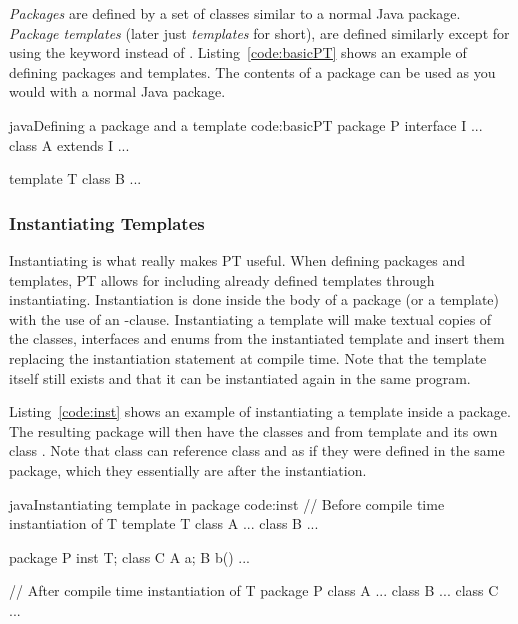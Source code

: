 \emph{Packages} are defined by a set of classes similar to a normal Java package.
\emph{Package templates} (later just \emph{templates} for short), are defined similarly except for using the keyword  instead of .
Listing~\vref{code:basicPT} shows an example of defining packages and templates.
The contents of a package can be used as you would with a normal Java package.

\begin{code}{java}{Defining a package  and a template }{code:basicPT}
    package P {
        interface I { ... }
        class A extends I { ... }
    }

    template T {
        class B { ... }
    }
\end{code}

\subsubsection{Instantiating Templates}\label{subsubsec:inst}
Instantiating is what really makes PT useful.
When defining packages and templates, PT allows for including already defined templates through instantiating.
Instantiation is done inside the body of a package (or a template) with the use of an -clause.
Instantiating a template will make textual copies of the  classes, interfaces and enums from the instantiated template and insert them replacing the instantiation statement at compile time.
Note that the template itself still exists and that it can be instantiated again in the same program.

Listing~\vref{code:inst} shows an example of instantiating a template inside a package.
The resulting package  will then have the classes  and  from template  and its own class .
Note that class  can reference class  and  as if they were defined in the same package, which they essentially are after the instantiation.

\begin{code}{java}{Instantiating template  in package }{code:inst}
// Before compile time instantiation of T
template T {
    class A { ... }
    class B { ... }
}

package P {
    inst T;
    class C {
        A a;
        B b() {
            ...
        }
    }
}

// After compile time instantiation of T
package P {
    class A { ... }
    class B { ... }
    class C { ... }
}
\end{code}

